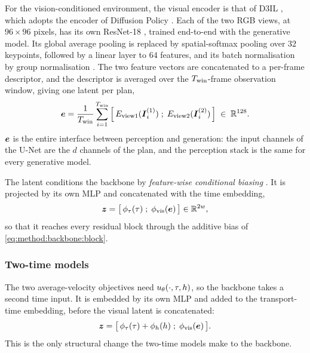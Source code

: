 For the vision-conditioned environment, the visual encoder is that of D3IL \parencite{jia2024towards},
which adopts the encoder of Diffusion Policy \parencite[Sec.~3.2]{chi2023diffusion}. Each of the two
RGB views, at $96\times96$ pixels, has its own ResNet-18 \parencite{he2016deep}, trained end-to-end
with the generative model. Its global average pooling is replaced by spatial-softmax pooling
\parencite{mandlekar2021matters} over $32$ keypoints, followed by a linear layer to $64$ features, and
its batch normalisation by group normalisation \parencite{wu2018group}. The two feature vectors are
concatenated to a per-frame descriptor, and the descriptor is averaged over the
$T_{\textrm{win}}$-frame observation window, giving one latent per plan,
\begin{equation}\label{eq:method:backbone:latent}
  \boldsymbol{e}
  = \frac{1}{T_{\textrm{win}}}\sum_{i=1}^{T_{\textrm{win}}}
    \Big[\,E_{\textrm{view1}}(\boldsymbol{I}^{(1)}_{i})\;;\;E_{\textrm{view2}}(\boldsymbol{I}^{(2)}_{i})\,\Big]
  \;\in\;\mathbb{R}^{128}.
\end{equation}
$\boldsymbol{e}$ is the entire interface between perception and generation: the input channels of the
U-Net are the $d$ channels of the plan, and the perception stack is the same for every generative
model.

The latent conditions the backbone by \emph{feature-wise conditional biasing}
\parencite[Sec.~3]{perez2017film}. It is projected by its own MLP and concatenated with the time
embedding,
\begin{equation}\label{eq:method:backbone:concat}
  \boldsymbol{z} = \big[\,\phi_{\tau}(\tau)\;;\;\phi_{\textrm{vis}}(\boldsymbol{e})\,\big] \in \mathbb{R}^{2w},
\end{equation}
so that it reaches every residual block through the additive bias of
\eqref{eq:method:backbone:block}.

\subsubsection*{Two-time models}

The two average-velocity objectives need $u_{\theta}(\cdot,\tau,h)$, so the backbone takes a
second time input. It is embedded by its own MLP and added to the transport-time embedding, before
the visual latent is concatenated:
\begin{equation}\label{eq:method:backbone:twotime}
  \boldsymbol{z} = \big[\,\phi_{\tau}(\tau) + \phi_{h}(h)\;;\;\phi_{\textrm{vis}}(\boldsymbol{e})\,\big].
\end{equation}
This is the only structural change the two-time models make to the backbone.

